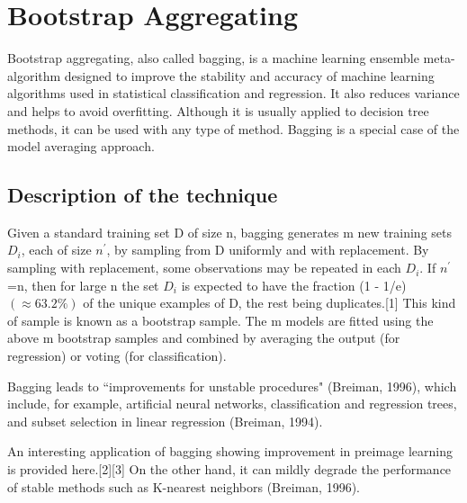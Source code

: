 \documentclass[a4paper,12pt]{article}
\begin{document}
\section*{Bootstrap Aggregating}

Bootstrap aggregating, also called bagging, is a machine learning ensemble meta-algorithm designed to improve the stability and accuracy of machine learning algorithms used in statistical classification and regression. It also reduces variance and helps to avoid overfitting. Although it is usually applied to decision tree methods, it can be used with any type of method. Bagging is a special case of the model averaging approach.


\subsection*{Description of the technique}
Given a standard training set D of size n, bagging generates m new training sets $D_i$, each of size $n^{\prime}$, by sampling from D uniformly and with replacement. By sampling with replacement, some observations may be repeated in each $D_i$. If $n^{\prime}$=n, then for large n the set $D_i$ is expected to have the fraction (1 - 1/e) $(\approx 63.2\%)$ of the unique examples of D, the rest being duplicates.[1] This kind of sample is known as a bootstrap sample. The m models are fitted using the above m bootstrap samples and combined by averaging the output (for regression) or voting (for classification).

Bagging leads to ``improvements for unstable procedures" (Breiman, 1996), which include, for example, artificial neural networks, classification and regression trees, and subset selection in linear regression (Breiman, 1994). 

An interesting application of bagging showing improvement in preimage learning is provided here.[2][3] On the other hand, it can mildly degrade the performance of stable methods such as K-nearest neighbors (Breiman, 1996).
\end{document}
